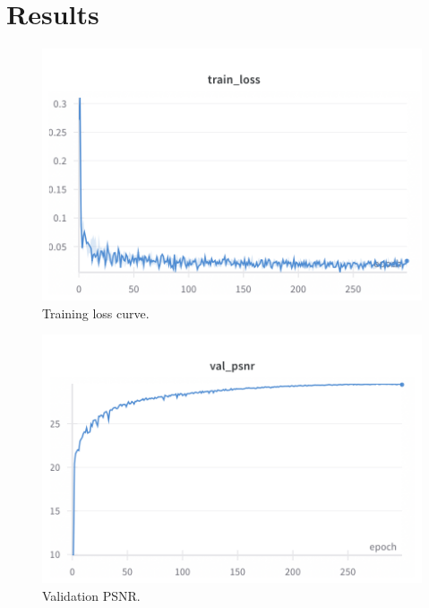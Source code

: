 \documentclass{article}
\begin{document}
\section{Results}
\begin{figure}[ht]
  \centering
  \includegraphics[width=.6\linewidth]{training_loss.png}
  \caption{Training loss curve.}
  \label{fig:trainloss}
\end{figure}

\begin{figure}[ht]
  \centering
  \includegraphics[width=.6\linewidth]{val_psnr.png}
  \caption{Validation PSNR.}
  \label{fig:valpsnr}
\end{figure}
\end{document}
